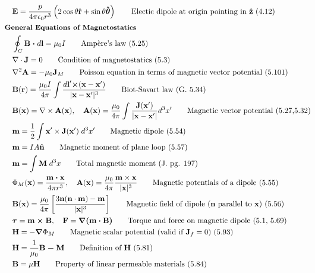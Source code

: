 \documentclass[10pt]{article}
\newcommand{\rhat}{\boldsymbol{\hat{\textbf{r}}}}
\newcommand{\zhat}{\boldsymbol{\hat{\textbf{z}}}}
\newcommand{\nhat}{\boldsymbol{\hat{\textbf{n}}}}
\newcommand{\thetahat}{\boldsymbol{\hat{\textbf{$\theta$}}}}
\newcommand{\ve}[1]{\boldsymbol{\mathbf{#1}}}
\newcommand{\vect}[1]{\boldsymbol{\mathbf{#1}}}
\newcommand{\eo}{\epsilon_0}
\newcommand{\lrp}[1]{\left( #1 \right)}
\begin{document}
\begin{multicols}{2}
\begin{align*}
		& \ve{E} = \frac{p}{4 \pi \eo r^3}\lrp{2 \cos \theta \rhat + \sin \theta \thetahat} \tag*{Electic dipole at origin pointing in $\zhat$ (4.12)} \\	
	& \small \hspace{-10pt} \textbf{General Equations of Magnetostatics} \small \\
		& \oint_C \ve{B} \; \ve{\cdot} \; d \ve{l} = \mu_0 I \tag*{Amp\`ere's law (5.25)} \\
		& \nabla \cdot \vect{J} = 0 \tag*{Condition of magnetostatics (5.3)} \\
		& \nabla^2 \vect{A} = -\mu_0 \vect{J}_M \tag*{Poisson equation in terms of magnetic vector potential (5.101)} \\
		& \ve{B}(\ve{r}) = \frac{\mu_0 I}{4 \pi} \int \frac{d\ve{l}' \ve{\times} (\ve{x} - \ve{x}')}{|\ve{x} - \ve{x}'|^3} \tag*{Biot-Savart law (G. 5.34)} \\
		& \vect{B}(\vect{x}) = \nabla \times \vect{A}(\vect{x}), \quad \vect{A}(\vect{x}) = \frac{\mu_0}{4 \pi} \int \frac{\vect{J}(\vect{x}')}{|\vect{x}-\vect{x}'|} d^3 x' \tag*{Magnetic vector potential (5.27,5.32)} \\
		& \vect{m} = \frac{1}{2} \int \vect{x}' \times \vect{J}(\vect{x}') \; d^3 x'	\tag*{Magnetic dipole (5.54)} \\
		& \vect{m} = IA \nhat \tag*{Magnetic moment of plane loop (5.57)} \\
		& \ve{m} = \int \ve{M} \; d^3 x \tag*{Total magnetic moment (J. pg. 197)} \\
		& \Phi_M(\vect{x}) = \frac{\vect{m \cdot x}}{4 \pi r^3}, \quad \vect{A}(\vect{x}) = \frac{\mu_0}{4 \pi} \frac{\vect{m} \times \vect{x}}{|\vect{x}|^3} \tag*{Magnetic potentials of a dipole (5.55)} \\
		& \vect{B}(\vect{x}) = \frac{\mu_0}{4 \pi} \left[ \frac{3 \vect{n}(\vect{n} \cdot \vect{m}) - \vect{m}}{|\vect{x}|^3} \right]\tag*{Magnetic field of dipole ($\ve{n}$ parallel to $\ve{x}$) (5.56)}\\
		& \ve{\tau} = \ve{m \times B}, \quad \vect{F} = \vect{\nabla(m \cdot B)} \tag*{Torque and force on magnetic dipole (5.1, 5.69)} \\
		& \vect{H} = -\vect{\nabla} \Phi_M \tag*{Magnetic scalar potential (valid if $\ve{J}_f = 0$) (5.93)} \\
		& \vect{H} = \frac{1}{\mu_0} \vect{B - M} \tag*{Definition of $\ve{H}$ (5.81)} \\
		& \vect{B} = \mu \vect{H} \tag*{Property of linear permeable materials (5.84)} \\

\end{align*}
\end{multicols}
\end{document}
